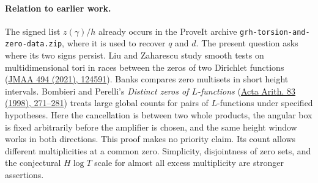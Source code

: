 \paragraph{Relation to earlier work.}
The signed list $z(\gamma)/h$ already occurs in the ProveIt archive
\texttt{grh-torsion-and-zero-data.zip}, where it is used to recover
$q$ and $d$. The present question asks where its two signs persist.
Liu and Zaharescu study smooth tests on multidimensional tori in races
between the zeros of two Dirichlet functions
(\href{https://doi.org/10.1016/j.jmaa.2020.124591}{JMAA 494 (2021), 124591}).
Banks compares zero multisets in short height intervals.
Bombieri and Perelli's \emph{Distinct zeros of $L$-functions}
(\href{https://doi.org/10.4064/aa-83-3-271-281}{Acta Arith. 83 (1998), 271--281})
treats large global counts for pairs of $L$-functions under specified
hypotheses. Here the cancellation is between two whole products,
the angular box is fixed arbitrarily before the amplifier is chosen,
and the same height window works in both directions.
This proof makes no priority claim. Its count allows different
multiplicities at a common zero. Simplicity, disjointness of zero sets,
and the conjectural $H\log T$ scale for almost all excess multiplicity
are stronger assertions.

